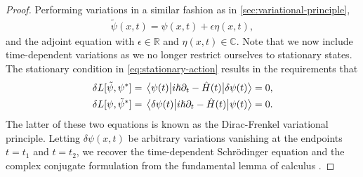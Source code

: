         \begin{proof}
            Performing variations in a similar fashion as in
            \autoref{sec:variational-principle},
            \begin{gather}
                \tilde{\psi}(x, t) = \psi(x, t) + \epsilon\eta(x, t),
            \end{gather}
            and the adjoint equation with $\epsilon \in \mathbb{R}$ and $\eta(x,
            t) \in \mathbb{C}$.
            Note that we now include time-dependent variations as we no longer
            restrict ourselves to stationary states.
            The stationary condition in \autoref{eq:stationary-action} results
            in the requirements that
            \begin{gather}
                \delta L[\tilde{\psi}, \psi^{*}]
                = \mel{\psi(t)}{i\hslash\partial_t - \hat{H}(t)}{\delta\psi(t)}
                = 0, \\
                \delta L[\psi, \tilde{\psi}^{*}]
                = \mel{\delta\psi(t)}{i\hslash\partial_t - \hat{H}(t)}{\psi(t)}
                = 0.
            \end{gather}
            The latter of these two equations is known as the Dirac-Frenkel
            variational principle.
            Letting $\delta\psi(x, t)$ be arbitrary variations vanishing at the
            endpoints $t = t_1$ and $t = t_2$, we recover the
            time-dependent Schrödinger equation and the complex conjugate
            formulation from the fundamental lemma of calculus \cite{frenkel,
            wiki:fundamental-lemma}.
        \end{proof}

